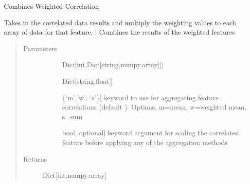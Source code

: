 \documentclass[letterpaper,10pt,english]{sphinxmanual}
\begin{document}
\begin{fulllineitems}
\label{\detokenize{generated/seg1d.algorithm.combine_corr:seg1d.algorithm.combine_corr}}
\sphinxAtStartPar
Combines Weighted Correlation

\sphinxAtStartPar
Takes in the correlated data results and multiply the weighting values
to each array of data for that feature.
| Combines the results of the weighted features
\begin{quote}\begin{description}
\item[{Parameters}] \leavevmode\begin{description}
\item[{}] \leavevmode{[}Dict{[}int,Dict{[}string,numpy.array{]}{]}{]}
\sphinxAtStartPar
{}

\item[{}] \leavevmode{[}Dict{[}string,float{]}{]}
\sphinxAtStartPar
{}

\item[{}] \leavevmode{[}\{‘m’,’w’, ‘s’\}{]}
\sphinxAtStartPar
keyword to use for aggregating feature correlations (default ).
Options, m=mean, w=weighted mean, s=sum

\item[{}] \leavevmode{[}bool, optional{]}
\sphinxAtStartPar
keyword argument for scaling the correlated feature before applying
any of the aggregation methods

\end{description}

\item[{Returns}] \leavevmode\begin{description}
\item[{Dict{[}int,numpy.array{]}}] \leavevmode
\sphinxAtStartPar
{}

\end{description}


\end{description}
\end{quote}
\end{fulllineitems}
\end{document}
